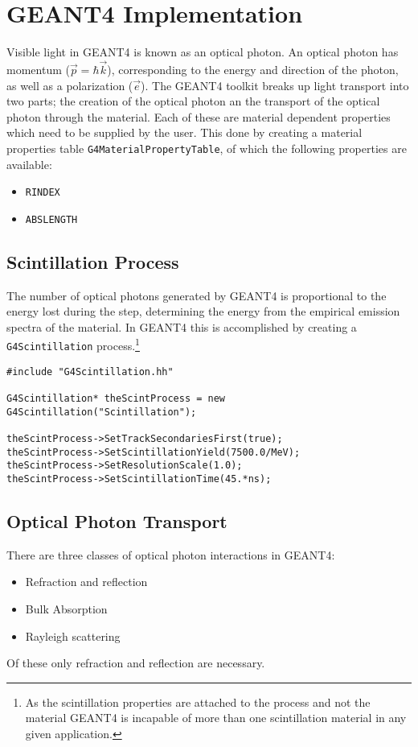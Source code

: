 

\section*{GEANT4 Implementation}
Visible light in GEANT4 is known as an optical photon.
An optical photon has momentum ($\vec{p} = \hbar \vec{k}$), corresponding to the energy and direction of the photon, as well as a polarization ($\vec{e}$).
The GEANT4 toolkit breaks up light transport into two parts; the creation of the optical photon an  the transport of the optical photon through the material.
Each of these are material dependent properties which need to be supplied by the user.
This done by creating a material properties table \lstinline{G4MaterialPropertyTable}, of which the following properties are available:
\begin{itemize}
    \item \verb+RINDEX+
    \item \verb+ABSLENGTH+
\end{itemize}
\subsection*{Scintillation Process}
The number of optical photons generated by GEANT4 is proportional to the energy lost during the step, determining the energy from the empirical emission spectra of the material.
In GEANT4 this is accomplished by creating a \verb+G4Scintillation+ process.\footnote{As the scintillation properties are attached to the process and not the material GEANT4 is incapable of more than one scintillation material in any given application.}
\begin{lstlisting}
#include "G4Scintillation.hh"

G4Scintillation* theScintProcess = new G4Scintillation("Scintillation");

theScintProcess->SetTrackSecondariesFirst(true);
theScintProcess->SetScintillationYield(7500.0/MeV);
theScintProcess->SetResolutionScale(1.0);
theScintProcess->SetScintillationTime(45.*ns);
\end{lstlisting}

\subsection*{Optical Photon Transport}
There are three classes of optical photon interactions in GEANT4:
\begin{itemize}
    \item Refraction and reflection
    \item Bulk Absorption
    \item Rayleigh scattering
\end{itemize}
Of these only refraction and reflection are necessary. \cite{cern_interactionsOfOpticalPhotons}

